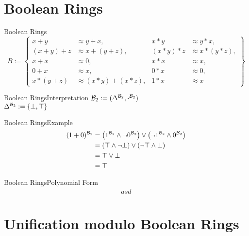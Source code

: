 \section{Boolean Rings}
\begin{frame}{Boolean Rings}
\[B:=\left\lbrace 
	\begin{aligned}
		x+y     & \approx y+x,         & x*y     & \approx y*x,     \\
		(x+y)+z & \approx x+(y+z),     & (x*y)*z & \approx x*(y*z), \\
		x+x     & \approx 0,           & x*x     & \approx x,       \\
		0+x     & \approx x,           & 0*x     & \approx 0,       \\
		x*(y+z) & \approx (x*y)+(x*z), & 1*x     & \approx x        
	\end{aligned}
	\right\rbrace \]
\end{frame}

\begin{frame}{Boolean Rings}{Interpretation}
${\mathcal{B}_2}:=(\Delta^{\mathcal{B}_2},\cdot^{\mathcal{B}_2})$\\
\vspace{10pt}\hspace{10pt}
$\Delta^{\mathcal{B}_2}:=\left\lbrace\bot,\top\right\rbrace$
\end{frame}

\begin{frame}{Boolean Rings}{Example}	
\begin{align*}
	(1+0)^{\mathcal{B}_2}&=\left( 1^{\mathcal{B}_2}\wedge\neg 0^{\mathcal{B}_2}\right) \vee \left( \neg1^{\mathcal{B}_2}\wedge 0^{\mathcal{B}_2}\right) \\
	&=\left( \top\wedge\neg\bot\right) \vee\left(\neg\top\wedge\bot \right) \\
	&=\top\vee\bot\\
	&=\top
\end{align*}
\end{frame}

\begin{frame}{Boolean Rings}{Polynomial Form}	
\begin{align*}
asd
\end{align*}
\end{frame}
\section{Unification modulo Boolean Rings}
